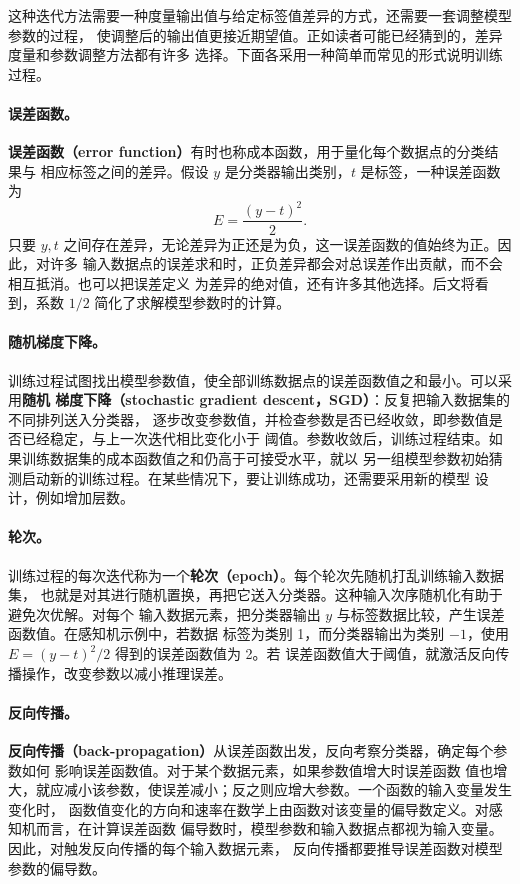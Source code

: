 这种迭代方法需要一种度量输出值与给定标签值差异的方式，还需要一套调整模型参数的过程，
使调整后的输出值更接近期望值。正如读者可能已经猜到的，差异度量和参数调整方法都有许多
选择。下面各采用一种简单而常见的形式说明训练过程。

\paragraph{误差函数。}
\textbf{误差函数（error function）}有时也称成本函数，用于量化每个数据点的分类结果与
相应标签之间的差异。假设 $y$ 是分类器输出类别，$t$ 是标签，一种误差函数为
\begin{equation}
  E=\frac{(y-t)^2}{2}.
  \label{eq:appb-6}
\end{equation}
只要 $y,t$ 之间存在差异，无论差异为正还是为负，这一误差函数的值始终为正。因此，对许多
输入数据点的误差求和时，正负差异都会对总误差作出贡献，而不会相互抵消。也可以把误差定义
为差异的绝对值，还有许多其他选择。后文将看到，系数 $1/2$ 简化了求解模型参数时的计算。

\paragraph{随机梯度下降。}
训练过程试图找出模型参数值，使全部训练数据点的误差函数值之和最小。可以采用\textbf{随机
梯度下降（stochastic gradient descent，SGD）}：反复把输入数据集的不同排列送入分类器，
逐步改变参数值，并检查参数是否已经收敛，即参数值是否已经稳定，与上一次迭代相比变化小于
阈值。参数收敛后，训练过程结束。如果训练数据集的成本函数值之和仍高于可接受水平，就以
另一组模型参数初始猜测启动新的训练过程。在某些情况下，要让训练成功，还需要采用新的模型
设计，例如增加层数。

\paragraph{轮次。}
训练过程的每次迭代称为一个\textbf{轮次（epoch）}。每个轮次先随机打乱训练输入数据集，
也就是对其进行随机置换，再把它送入分类器。这种输入次序随机化有助于避免次优解。对每个
输入数据元素，把分类器输出 $y$ 与标签数据比较，产生误差函数值。在感知机示例中，若数据
标签为类别 1，而分类器输出为类别 $-1$，使用 $E=(y-t)^2/2$ 得到的误差函数值为 2。若
误差函数值大于阈值，就激活反向传播操作，改变参数以减小推理误差。

\paragraph{反向传播。}
\textbf{反向传播（back-propagation）}从误差函数出发，反向考察分类器，确定每个参数如何
影响误差函数值\cite{appb-lecun-handwritten}。对于某个数据元素，如果参数值增大时误差函数
值也增大，就应减小该参数，使误差减小；反之则应增大参数。一个函数的输入变量发生变化时，
函数值变化的方向和速率在数学上由函数对该变量的偏导数定义。对感知机而言，在计算误差函数
偏导数时，模型参数和输入数据点都视为输入变量。因此，对触发反向传播的每个输入数据元素，
反向传播都要推导误差函数对模型参数的偏导数。

